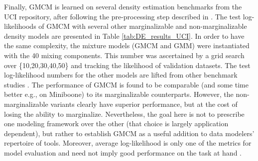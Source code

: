\documentclass{article}
\theoremstyle{plain}
\theoremstyle{definition}
\theoremstyle{remark}
\begin{document}
Finally, GMCM is learned on several density estimation benchmarks from the UCI repository, after following the pre-processing step described in \citep{Papamakarios2017}. The test log-likelihoods of GMCM with several other marginalizable and non-marginalizable density models are presented in Table \ref{tab:DE_results_UCI}. In order to have the same complexity, the mixture models (GMCM and GMM) were instantiated with the 40 mixing components. This number was ascertained by a grid search over \{10,20,30,40,50\} and tracking the likelihood of validation datasets. The test log-likelihood numbers for the other models are lifted from other benchmark studies \citep{Papamakarios2017, Gilboa2021}. The performance of GMCM is found to be comparable (and some time better e.g., on Miniboone) to its marginalizable counterparts. However, the non-marginalizable variants clearly have superior performance, but at the cost of losing the ability to marginalize. Nevertheless, the goal here is not to prescribe one modeling framework over the other (that choice is largely application dependent), but rather to establish GMCM as a useful addition to data modelers' repertoire of tools. Moreover, average log-likelihood is only one of the metrics for model evaluation and need not imply good performance on the task at hand \citep{Theis2015}.
\end{document}
